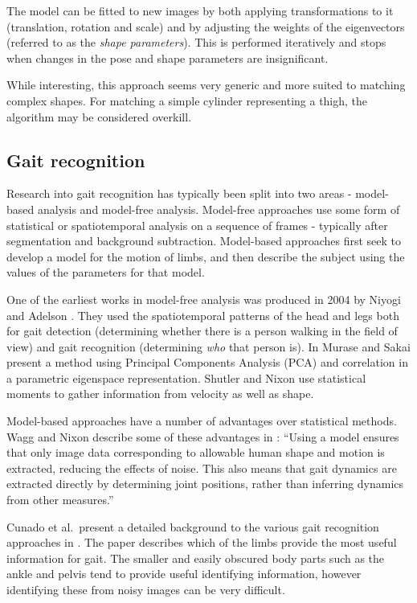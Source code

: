 The model can be fitted to new images by both applying transformations to it (translation, rotation and scale) and by adjusting the weights of the eigenvectors (referred to as the \emph{shape parameters}).
This is performed iteratively and stops when changes in the pose and shape parameters are insignificant.

While interesting, this approach seems very generic and more suited to matching complex shapes.
For matching a simple cylinder representing a thigh, the algorithm may be considered overkill.

\subsection{Gait recognition}

Research into gait recognition has typically been split into two areas - model-based analysis and model-free analysis.
Model-free approaches use some form of statistical or spatiotemporal analysis on a sequence of frames - typically after segmentation and background subtraction.
Model-based approaches first seek to develop a model for the motion of limbs, and then describe the subject using the values of the parameters for that model.

One of the earliest works in model-free analysis was produced in 2004 by Niyogi and Adelson \cite{XYT}.
They used the spatiotemporal patterns of the head and legs both for gait detection (determining whether there is a person walking in the field of view) and gait recognition (determining \emph{who} that person is).
In \cite{EigenRecognition} Murase and Sakai present a method using Principal Components Analysis (PCA) and correlation in a parametric eigenspace representation.
Shutler and Nixon \cite{ZernikeMoments} use statistical moments to gather information from velocity as well as shape.

\bigskip
\noindent Model-based approaches have a number of advantages over statistical methods.
Wagg and Nixon describe some of these advantages in \cite{ecs9374}:
``Using a model ensures that only image data corresponding to allowable human shape and motion is extracted, reducing the effects of noise.
This also means that gait dynamics are extracted directly by determining joint positions, rather than inferring dynamics
from other measures.''

\bigskip
\noindent Cunado et al.\ present a detailed background to the various gait recognition approaches in \cite{GaitModels}.
The paper describes which of the limbs provide the most useful information for gait.
The smaller and easily obscured body parts such as the ankle and pelvis tend to provide useful identifying information, however identifying these from noisy images can be very difficult.

